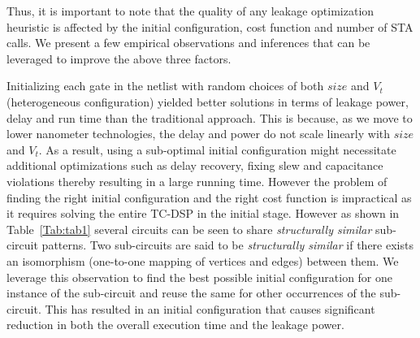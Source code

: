 \noindent Thus, it is important to note that the quality of any leakage optimization heuristic is affected by the initial configuration, cost function and number of STA calls. We present a few empirical observations and inferences that can be leveraged to improve the above three factors.


\noindent Initializing each gate in the netlist  with random choices of both $size$ and $V_t$ (heterogeneous configuration) yielded better solutions in terms of  leakage power, delay and run time than the traditional approach. This is because, as we move to lower nanometer technologies, the delay and power do not scale linearly with $size$ and $V_{t}$. As a result, using a sub-optimal initial configuration might necessitate additional optimizations such as delay recovery, fixing slew and capacitance violations thereby resulting in a large running time. However the problem of finding the right initial configuration and the right cost function is impractical as it requires solving the entire TC-DSP in the initial stage. However as shown in Table~\ref{Tab:tab1}  several circuits can be seen to share \textit{structurally similar} sub-circuit patterns. Two sub-circuits are said to be \textit{structurally similar} if there exists an isomorphism (one-to-one mapping of vertices and edges) between them.  We leverage this observation to find the best possible initial configuration for one instance of the sub-circuit and  reuse the same for other occurrences of the sub-circuit. This has resulted in an initial configuration that causes significant reduction in both the overall execution time and the leakage power.



